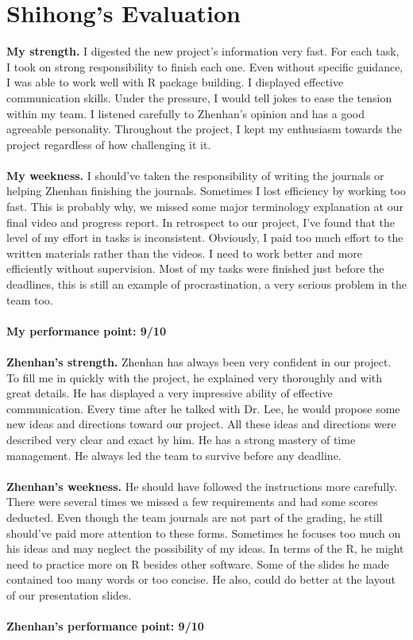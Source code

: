 \documentclass[12pt,letterpaper]{article}
\theoremstyle{definition}
\begin{document}
\section{Shihong's Evaluation}
 {\bf My strength.} I digested the new project's information very fast. For each task, I took on strong responsibility to finish each one. Even without specific guidance, I was able to work well with R package building. I displayed effective communication skills. Under the pressure, I would tell jokes to ease the tension within my team. I listened carefully to Zhenhan's opinion and has a good agreeable personality. Throughout the project,  I kept my enthusiasm towards the project regardless of how challenging it it. \\
\vspace{1 mm}
\noindent  \\
 {\bf My weekness.} I should've taken the responsibility of writing the journals or helping Zhenhan finishing the journals. Sometimes I lost efficiency by working too fast. This is probably why, we missed some major terminology explanation at our final video and progress report. In retrospect to our project, I've found that the level of my effort in tasks is inconsistent. Obviously, I paid too much effort to the written materials rather than the videos. I need to work better and more efficiently without supervision. Most of my tasks were finished just before the deadlines, this is still an example of procrastination, a very serious problem in the team too. \\
\vspace{1 mm}
\noindent  \\
{\bf My performance point: 9/10}\\
\vspace{5 mm}
\noindent  \\
 {\bf Zhenhan's strength.} Zhenhan has always  been very confident in our project. To fill me in quickly with the project, he explained very thoroughly and with great details. He has displayed a very impressive ability of effective communication. Every time after he talked with Dr. Lee, he would propose some new ideas and directions toward our project. All these ideas and directions were described very clear and exact by him. He has a strong mastery of time management. He always led the team to survive before any deadline. \\
\vspace{1 mm}
\noindent  \\
{\bf Zhenhan's weekness.}  He should have followed the instructions more carefully. There were several times we missed a few requirements and had some scores deducted. Even though the team journals are not part of the grading, he still should've paid more attention to these forms. Sometimes he focuses too much on his ideas and may neglect the possibility of my ideas. In terms of the R, he might need to practice more on R besides other software. Some of the slides he made contained too many words or too concise. He also, could do better at the layout of our presentation slides. \\
\vspace{1 mm}
\noindent  \\
{\bf Zhenhan's performance point: 9/10}\\
\end{document}
